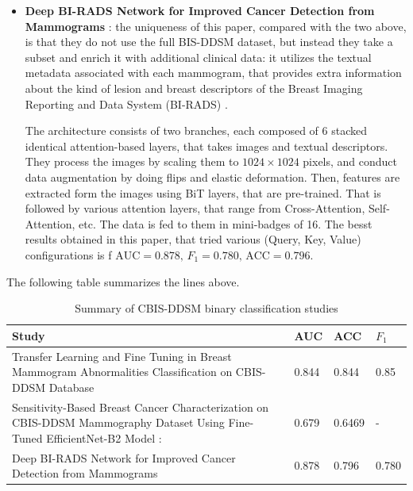\documentclass[ENG]{TFUOC}%
\begin{document}
\begin{itemize}
    Since the amount of images corresponding to beningn tumors is greater than the ones depicting malignant tumors, they opted for imbalance-conscious learning methods: an EffincientNet-B2, that was pretrained, followed by Global Average Pooling, a Fully Connected layer, Batch Normalization and a Sigmoid output layer. They fine-tuned the last 25 layers of the model and obtained $\text{AUC}=0.679\text{, ACC}= 0.6496$, which is not bad considering that it had a small ammount of trainable parameters.
    \item \textbf{Deep BI-RADS Network for Improved Cancer Detection from Mammograms} \cite{binary_CBIS-DDSM_3}:
    the uniqueness of this paper, compared with the two above, is that they do not use the full BIS-DDSM dataset, but instead they take a subset and enrich it with additional clinical data: it utilizes the textual metadata associated with each mammogram, that provides extra information about the kind of lesion and breast descriptors of the Breast Imaging Reporting and Data System (BI-RADS) \cite{birads}.

    The architecture consists of two branches, each composed of 6 stacked identical attention-based layers, that takes images and textual descriptors. They process the images by scaling them to $1024\times1024$ pixels, and conduct data augmentation by doing flips and elastic deformation. Then, features are extracted form the images using BiT layers, that are pre-trained. That is followed by various attention layers, that range from Cross-Attention, Self-Attention, etc. The data is fed to them in mini-badges of 16. The besst results obtained in this paper, that tried various (Query, Key, Value) configurations is f $\text{AUC}=0.878\text{, }F_{1}= 0.780\text{, ACC}= 0.796$.
\end{itemize}

The following table summarizes the lines above.


\begin{table}[htbp]
\centering
\caption{Summary of CBIS-DDSM binary classification studies}
\label{tab:cbis_summary}
\begin{tabular}{ |m{25em} |m{3em} |m{3em} |m{3em} | } 
 \hline
 Study & AUC & ACC & $F_1$ \\ 
 \hline
 \hline
 Transfer Learning and Fine Tuning in Breast Mammogram Abnormalities Classification on CBIS-DDSM Database \cite{binary_CBIS-DDSM_1} & 0.844& 0.844 & 0.85 \\ 
 \hline 
 Sensitivity-Based Breast Cancer Characterization on CBIS-DDSM Mammography Dataset Using Fine-Tuned EfficientNet-B2 Model \cite{binary_CBIS-DDSM_2}: & 0.679& 0.6469 & - \\ 
 \hline 
 Deep BI-RADS Network for Improved Cancer Detection from Mammograms \cite{binary_CBIS-DDSM_3} &0.878& 0.796&0.780 \\
 \hline
\end{tabular}
\end{table}
\end{document}
